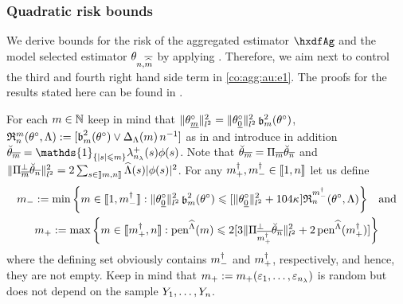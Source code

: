 \subsubsection{Quadratic risk bounds}\label{freq:ge:strat:uk:qu}
\begin{te}
  We derive bounds for the risk of the aggregated estimator $\hxdfAg$
  and the model selected estimator $\theta_{n, \overline{\hDi}}$ by applying
  . Therefore, we aim next to control the third and
  fourth right hand side term in \eqref{co:agg:au:e1}.
  The proofs for the results stated here can be found in .
\end{te}
\begin{te}
For each $\Di\in\Nz$ keep in mind that
$\Vnormlp{\xdf_{\underline{\Di}}}^2=\Vnormlp{\xdf_{\underline{0}}}^2\bias[\Di]^2(\xdf)$,  
  $\daRa{\Di}{(\theta^{\circ},\Lambda)}:=[\b_{m}^{2}(\theta^{\circ})\vee \DipenSv\,\ssY^{-1}]$ as in
   and
introduce in addition
$\dxdfPr=\mathds{1}_{\{\vert s \vert \leq m\}}\hfedfmpI[(s)]\fydf[(s)]$. Note
that  $\dxdfPr=\Proj[\Di]\dxdfPr[\ssY]$
and $\Vnormlp{\ProjC[\Di]\dxdfPr[\ssY]}^2=2\sum_{s\in\nsetlo{\Di,\ssY}}\eiSv[(s)] \vert \fydf[(s)] \vert ^2$. For any $\pdDi,\mdDi\in\nset{1,\ssY}$ let us define 
\begin{multline}\label{au:de:*Di:ag}
\mDi:=\min\set{\Di\in\nset{1,\mdDi}: \Vnormlp{\xdf_{\underline{0}}}^2\bias^2(\xdf)\leq
  [\Vnormlp{\xdf_{\underline{0}}}^2+104\cpen]\daRa{\mdDi}{(\xdf,\Lambda)}}\quad\text{and}\\\pDi:=\max\set{\Di\in\nset{\pdDi,\ssY}:
   \peneSv \leq 2[3\Vnormlp{\ProjC[\pdDi]\dxdfPr[\ssY]}^2+2\peneSv[(\pdDi)]]}
\end{multline}
where  the defining set obviously contains $\mdDi$ and $\pdDi$, respectively, 
and hence, they are
not empty. Keep in mind that $\pDi:=\pDi(\rE_1,\dotsc,\rE_{\ssE})$ is
random but does not depend on the sample $\rY_1,\dotsc,\rY_{\ssY}$.
\end{te}

